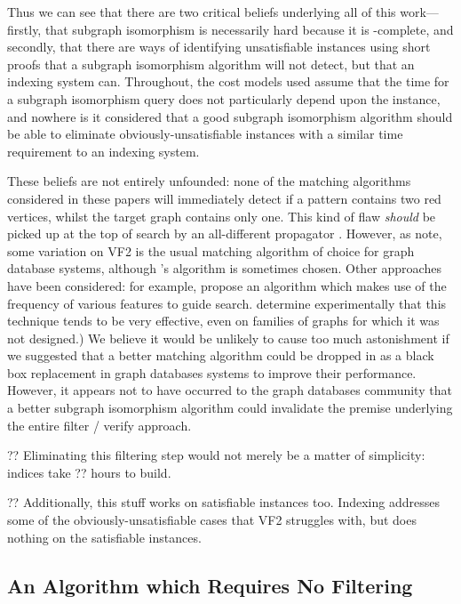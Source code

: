 \documentclass[twoside,11pt]{article}
\newcommand{\citet}[1]{\citeA{#1}}
\newcommand{\citep}[1]{\cite{#1}}
\begin{document}
Thus we can see that there are two critical beliefs underlying all of this work---firstly, that
subgraph isomorphism is necessarily hard because it is \NP-complete, and secondly, that there are
ways of identifying unsatisfiable instances using short proofs that a subgraph isomorphism algorithm
will not detect, but that an indexing system can. Throughout, the cost models used assume that the
time for a subgraph isomorphism query does not particularly depend upon the instance, and nowhere is
it considered that a good subgraph isomorphism algorithm should be able to eliminate
obviously-unsatisfiable instances with a similar time requirement to an indexing system.

These beliefs are not entirely unfounded: none of the matching algorithms considered in these papers
will immediately detect if a pattern contains two red vertices, whilst the target graph contains
only one. This kind of flaw \emph{should} be picked up at the top of search by an all-different
propagator \citep{DBLP:conf/aaai/Regin94}.  However, as \citet{DBLP:journals/pvldb/KatsarouNT15}
note, some variation on VF2 \citep{Cordella:2004} is the usual matching algorithm of choice for
graph database systems, although 's algorithm is sometimes
chosen. Other approaches have been considered: for example, \citet{DBLP:journals/pvldb/ShangZLY08}
propose an algorithm which makes use of the frequency of various features to guide search.
\citet{DBLP:journals/pvldb/LeeHKL12} determine experimentally that this technique tends to be very
effective, even on families of graphs for which it was not designed.) We believe it would be
unlikely to cause too much astonishment if we suggested that a better matching algorithm could be
dropped in as a black box replacement in graph databases systems to improve their performance.
However, it appears not to have occurred to the graph databases community that a better subgraph
isomorphism algorithm could invalidate the premise underlying the entire filter / verify approach.

?? Eliminating this filtering step would not merely be a matter of simplicity: indices take ??  hours
to build.

?? Additionally, this stuff works on satisfiable instances too. Indexing addresses some of the
obviously-unsatisfiable cases that VF2 struggles with, but does nothing on the satisfiable
instances.

\subsection{An Algorithm which Requires No Filtering}
\end{document}
